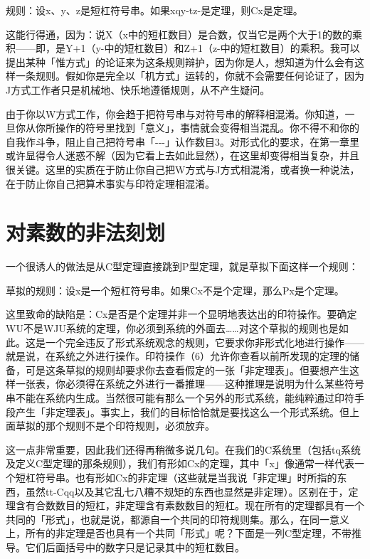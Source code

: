 \documentclass[
  12pt,
  twoside,
  openright,
  oldfontcommands,
]{memoir}
\begin{document}
规则：设x、y、z是短杠符号串。如果xqy-tz-是定理，则Cx是定理。

这能行得通，因为：说X（x中的短杠数目）是合数，仅当它是两个大于1的数的乘积------即，是Y+1（y-中的短杠数目）和Z+1（z-中的短杠数目）的乘积。我可以提出某种「惟方式」的论证来为这条规则辩护，因为你是人，想知道为什么会有这样一条规则。假如你是完全以「机方式」运转的，你就不会需要任何论证了，因为J方式工作者只是机械地、快乐地遵循规则，从不产生疑问。

由于你以W方式工作，你会趋于把符号串与对符号串的解释相混淆。你知道，一旦你从你所操作的符号里找到「意义」，事情就会变得相当混乱。你不得不和你的自我作斗争，阻止自己把符号串「-\/-\/-」认作数目3。对形式化的要求，在第一章里或许显得令人迷惑不解（因为它看上去如此显然），在这里却变得相当复杂，并且很关键。这里的实质在于防止你自己把W方式与J方式相混淆，或者换一种说法，在于防止你自己把算术事实与印符定理相混淆。

\section{对素数的非法刻划}

一个很诱人的做法是从C型定理直接跳到P型定理，就是草拟下面这样一个规则：

草拟的规则：设x是一个短杠符号串。如果Cx不是个定理，那么Px是个定理。

这里致命的缺陷是：Cx是否是个定理并非一个显明地表达出的印符操作。要确定WU不是WJU系统的定理，你必须到系统的外面去\ldots\ldots 对这个草拟的规则也是如此。这是一个完全违反了形式系统观念的规则，它要求你非形式化地进行操作------就是说，在系统之外进行操作。印符操作（6）允许你查看以前所发现的定理的储备，可是这条草拟的规则却要求你去查看假定的一张「非定理表」。但要想产生这样一张表，你必须得在系统之外进行一番推理------这种推理是说明为什么某些符号串不能在系统内生成。当然很可能有那么一个另外的形式系统，能纯粹通过印符手段产生「非定理表」。事实上，我们的目标恰恰就是要找这么一个形式系统。但上面草拟的那个规则不是个印符规则，必须放弃。

这一点非常重要，因此我们还得再稍微多说几句。在我们的C系统里（包括tq系统及定义C型定理的那条规则），我们有形如Cx的定理，其中「x」像通常一样代表一个短杠符号串。也有形如Cx的非定理（这些就是当我说「非定理」时所指的东西，虽然tt-Cqq以及其它乱七八糟不规矩的东西也显然是非定理）。区别在于，定理含有合数数目的短杠，非定理含有素数数目的短杠。现在所有的定理都具有一个共同的「形式」，也就是说，都源自一个共同的印符规则集。那么，在同一意义上，所有的非定理是否也具有一个共同「形式」呢？下面是一列C型定理，不带推导。它们后面括号中的数字只是记录其中的短杠数目。
\end{document}
